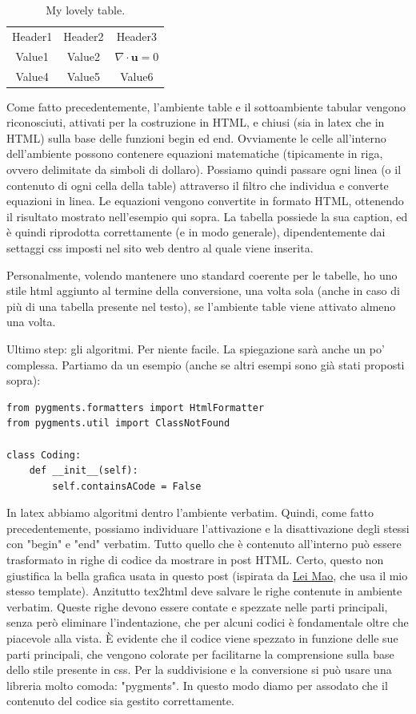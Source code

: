 \begin{table}
\caption{My lovely table.}
\begin{tabular}{c c c}
Header1 & Header2 & Header3 \\
Value1  & Value2  & $\nabla \cdot \mathbf{u} = 0$ \\
Value4  & Value5  & Value6 \\
\end{tabular}
\end{table}

Come fatto precedentemente, l'ambiente table e il sottoambiente tabular vengono riconosciuti, attivati per la costruzione in HTML, e chiusi (sia in latex che in HTML) sulla base delle funzioni begin ed end. Ovviamente le celle all'interno dell'ambiente possono contenere equazioni matematiche (tipicamente in riga, ovvero delimitate da simboli di dollaro). Possiamo quindi passare ogni linea (o il contenuto di ogni cella della table) attraverso il filtro che individua e converte equazioni in linea. Le equazioni vengono convertite in formato HTML, ottenendo il risultato mostrato nell'esempio qui sopra. La tabella possiede la sua caption, ed è quindi riprodotta correttamente (e in modo generale), dipendentemente dai settaggi css imposti nel sito web dentro al quale viene inserita. 

Personalmente, volendo mantenere uno standard coerente per le tabelle, ho uno stile html aggiunto al termine della conversione, una volta sola (anche in caso di più di una tabella presente nel testo), se l'ambiente table viene attivato almeno una volta.

Ultimo step: gli algoritmi. Per niente facile. La spiegazione sarà anche un po' complessa. Partiamo da un esempio (anche se altri esempi sono già stati proposti sopra):
\begin{verbatim}
from pygments.formatters import HtmlFormatter
from pygments.util import ClassNotFound

class Coding:
    def __init__(self):
        self.containsACode = False
\end{verbatim}

In latex abbiamo algoritmi dentro l'ambiente verbatim. Quindi, come fatto precedentemente, possiamo individuare l'attivazione e la disattivazione degli stessi con "begin" e "end" verbatim. Tutto quello che è contenuto all'interno può essere trasformato in righe di codice da mostrare in post HTML. Certo, questo non giustifica la bella grafica usata in questo post (ispirata da \href{https://leimao.github.io/}{Lei Mao}, che usa il mio stesso template). Anzitutto tex2html deve salvare le righe contenute in ambiente verbatim. Queste righe devono essere contate e spezzate nelle parti principali, senza però eliminare l'indentazione, che per alcuni codici è fondamentale oltre che piacevole alla vista. È evidente che il codice viene spezzato in funzione delle sue parti principali, che vengono colorate per facilitarne la comprensione sulla base dello stile presente in css. Per la suddivisione e la conversione si può usare una libreria molto comoda: "pygments". In questo modo diamo per assodato che il contenuto del codice sia gestito correttamente. 

